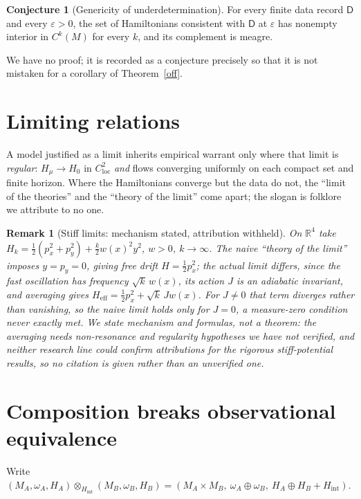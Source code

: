 \documentclass[12pt,a4paper]{article}
\theoremstyle{definition}
\newtheorem{conjecture}[definition]{Conjecture}
\theoremstyle{plain}
\theoremstyle{commentary}
\newtheorem{remark}[definition]{Remark}
\newcommand{\R}{\mathbb{R}}
\newcommand{\Dsf}{\mathsf{D}}
\newcommand{\eps}{\varepsilon}
\begin{document}
\begin{conjecture}[Genericity of underdetermination]
\label{gen}
For every finite data record $\Dsf$ and every $\eps>0$, the set of Hamiltonians consistent with $\Dsf$ at $\eps$ has nonempty interior in $C^k(M)$ for every $k$, and its complement is meagre.
\end{conjecture}

We have no proof; it is recorded as a conjecture precisely so that it is not mistaken for a corollary of Theorem~\ref{off}.

\section{Limiting relations}
\label{s6}

A model justified as a limit inherits empirical warrant only where that limit is \emph{regular}: $H_\mu\to H_0$ in $C^2_{\mathrm{loc}}$ \emph{and} flows converging uniformly on each compact set and finite horizon. Where the Hamiltonians converge but the data do not, the ``limit of the theories'' and the ``theory of the limit'' come apart; the slogan is folklore we attribute to no one.

\begin{remark}[Stiff limits: mechanism stated, attribution withheld]
\label{stf}
On $\R^4$ take $H_k=\tfrac12(p_x^2+p_y^2)+\tfrac k2w(x)^2y^2$, $w>0$, $k\to\infty$. The naive ``theory of the limit'' imposes $y=p_y=0$, giving free drift $H=\tfrac12p_x^2$; the actual limit differs, since the fast oscillation has frequency $\sqrt k\,w(x)$, its action $J$ is an adiabatic invariant, and averaging gives $H_{\mathrm{eff}}=\tfrac12p_x^2+\sqrt k\,Jw(x)$. For $J\neq0$ that term \emph{diverges} rather than vanishing, so the naive limit holds only for $J=0$, a measure-zero condition never exactly met. We state mechanism and formulas, not a theorem: the averaging needs non-resonance and regularity hypotheses we have not verified, and neither research line could confirm attributions for the rigorous stiff-potential results, so no citation is given rather than an unverified one.
\end{remark}

\section{Composition breaks observational equivalence}
\label{s7}

Write $(M_A,\omega_A,H_A)\otimes_{H_{\mathrm{int}}}(M_B,\omega_B,H_B)=(M_A\times M_B,\ \omega_A\oplus\omega_B,\ H_A\oplus H_B+H_{\mathrm{int}})$.
\end{document}
